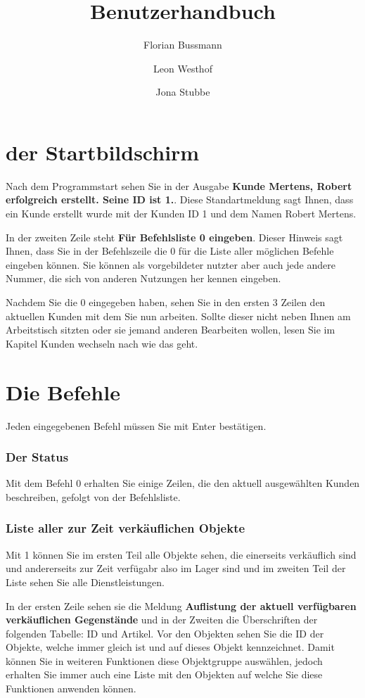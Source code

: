 ﻿\documentclass[a4paper,12pt,titlepage]{article}
\title{Benutzerhandbuch}
\author{Florian Bussmann \and Leon Westhof \and Jona Stubbe}
\newcommand\enquote[1]{{\ttfamily \bfseries #1}}
\begin{document}
\maketitle
\tableofcontents

\part{der Startbildschirm}
Nach dem Programmstart sehen Sie in der Ausgabe \enquote{Kunde Mertens, Robert erfolgreich erstellt. Seine ID ist 1.}.
Diese Standartmeldung sagt Ihnen, dass ein Kunde erstellt wurde mit der Kunden ID 1 und dem Namen Robert Mertens.

In der zweiten Zeile steht \enquote{Für Befehlsliste 0 eingeben}.
Dieser Hinweis sagt Ihnen, dass Sie in der Befehlszeile die 0 für die Liste aller möglichen Befehle eingeben können.
Sie können als vorgebildeter nutzter aber auch jede andere Nummer, die sich von anderen Nutzungen her kennen eingeben.

Nachdem Sie die 0 eingegeben haben, sehen Sie in den ersten 3 Zeilen den aktuellen Kunden mit dem Sie nun arbeiten.
Sollte dieser nicht neben Ihnen am Arbeitstisch sitzten oder sie jemand anderen Bearbeiten wollen, lesen Sie im Kapitel Kunden wechseln nach wie das geht.

\part{Die Befehle}
Jeden eingegebenen Befehl müssen Sie mit Enter bestätigen.

\section{Der Status}
Mit dem Befehl 0 erhalten Sie einige Zeilen, die den aktuell ausgewählten Kunden beschreiben,
gefolgt von der Befehlsliste.

\section{Liste aller zur Zeit verkäuflichen Objekte}
Mit 1 können Sie im ersten Teil alle Objekte sehen,
 die einerseits verkäuflich sind und andererseits zur Zeit verfügabr also im Lager sind und im zweiten Teil der Liste sehen Sie alle Dienstleistungen.

In der ersten Zeile sehen sie die Meldung \enquote{Auflistung der aktuell verfügbaren verkäuflichen Gegenstände}
 und in der Zweiten die Überschriften der folgenden Tabelle: ID und Artikel.
Vor den Objekten sehen Sie die ID der Objekte, welche immer gleich ist
 und auf dieses Objekt kennzeichnet.
Damit können Sie in weiteren Funktionen diese Objektgruppe auswählen,
 jedoch erhalten Sie immer auch eine Liste mit den Objekten auf welche Sie diese Funktionen anwenden können.
\end{document}
